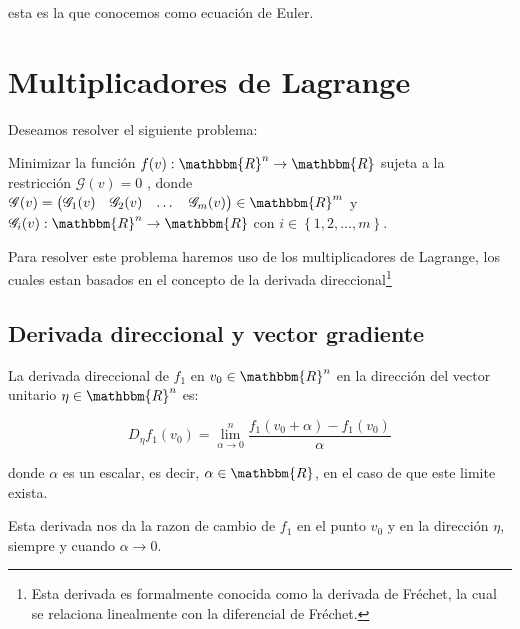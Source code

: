         esta es la que conocemos como ecuación de Euler.

    \newpage
    \section{Multiplicadores de Lagrange}

        Deseamos resolver el siguiente problema:

        Minimizar la función
        $f(v):\mathbbm{R}^n \to \mathbbm{R}$
        sujeta a la restricción $\mathscr{G}(v) = 0$
        , donde $\mathscr{G}(v)=\begin{pmatrix}\mathscr{G}_1(v) & \mathscr{G}_2(v) & \dots & \mathscr{G}_m(v) \end{pmatrix} \in \mathbbm{R}^m$
         y $\mathscr{G}_i(v): \mathbbm{R}^n \to \mathbbm{R}$
         con $i \in \left\{ 1, 2, \dots, m \right\}$.

        Para resolver este problema haremos uso de los multiplicadores de Lagrange, los cuales estan basados en el concepto de la derivada direccional\footnote{Esta derivada es formalmente conocida como la derivada de Fréchet, la cual se relaciona linealmente con la diferencial de Fréchet.}

        \subsection{Derivada direccional y vector gradiente}

            \begin{definicion}
                La derivada direccional de $f_1$ en $v_0 \in \mathbbm{R}^n$ en la dirección del vector unitario $\eta \in \mathbbm{R}^n$ es:

                \begin{equation}
                    D_{\eta} f_1(v_0) = \lim_{\alpha \to 0}^{n}  \frac{f_1(v_0 + \alpha) - f_1(v_0)}{\alpha}
                \end{equation}

                donde $\alpha$ es un escalar, es decir, $\alpha \in \mathbbm{R}$, en el caso de que este limite exista.



                Esta derivada nos da la razon de cambio de $f_1$ en el punto $v_0$ y en la dirección $\eta$, siempre y cuando $\alpha \to 0$.
            \end{definicion}

